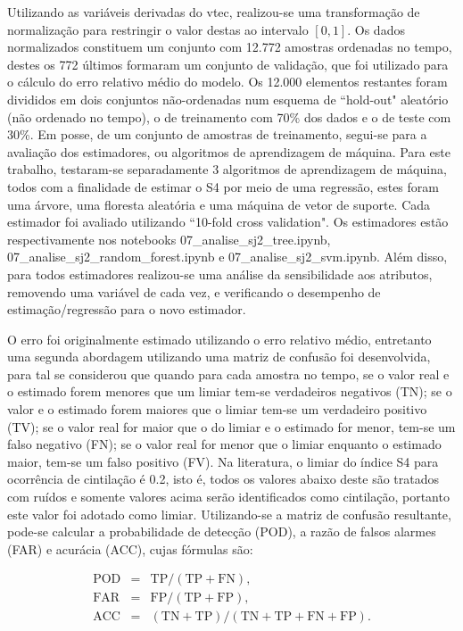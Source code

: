 Utilizando as variáveis derivadas do vtec, realizou-se uma transformação de normalização para restringir o valor destas ao intervalo $[0,1]$. Os dados normalizados constituem um conjunto com 12.772 amostras ordenadas no tempo, destes os 772 últimos formaram um conjunto de validação, que foi utilizado para o cálculo do erro relativo médio do modelo. Os 12.000 elementos restantes foram divididos em dois conjuntos não-ordenadas num esquema de ``hold-out" aleatório (não ordenado no tempo), o de treinamento com 70\% dos dados e o de teste com 30\%. Em posse, de um conjunto de amostras de treinamento, segui-se para a avaliação dos estimadores, ou algoritmos de aprendizagem de máquina. Para este trabalho, testaram-se separadamente 3 algoritmos de aprendizagem de máquina, todos com a finalidade de estimar o S4 por meio de uma regressão, estes foram uma árvore, uma floresta aleatória e uma máquina de vetor de suporte. Cada estimador  foi avaliado utilizando ``10-fold cross validation". Os estimadores estão respectivamente nos notebooks 07\_analise\_sj2\_tree.ipynb, 07\_analise\_sj2\_random\_forest.ipynb e 07\_analise\_sj2\_svm.ipynb. Além disso, para todos estimadores realizou-se uma análise da sensibilidade aos atributos, removendo uma variável de cada vez, e verificando o desempenho de estimação/regressão para o novo estimador. 

O erro foi originalmente estimado utilizando o erro relativo médio, entretanto uma segunda abordagem utilizando uma matriz de confusão foi desenvolvida, para tal se considerou que quando para cada amostra no tempo, se o valor real e o estimado forem menores que um limiar tem-se verdadeiros negativos (TN); se o valor e o estimado forem maiores que o limiar tem-se um verdadeiro positivo (TV); se o valor real for maior que o do limiar e o estimado for menor, tem-se um falso negativo (FN); se o valor real for menor que o limiar enquanto o estimado maior, tem-se um falso positivo (FV). Na literatura, o limiar do índice S4 para ocorrência de cintilação é 0.2, isto é, todos os valores abaixo deste são tratados com ruídos e somente valores acima serão identificados como cintilação, portanto este valor foi adotado como limiar. Utilizando-se a matriz de confusão resultante, pode-se calcular a probabilidade de detecção (POD), a razão de falsos alarmes (FAR) e acurácia (ACC), cujas fórmulas são:

\begin{eqnarray}
\mbox{POD}&=&\mbox{TP}/(\mbox{TP}+\mbox{FN})\mbox{,}\\
\mbox{FAR}&=&\mbox{FP}/(\mbox{TP}+\mbox{FP})\mbox{,}\\ 
\mbox{ACC}&=&(\mbox{TN}+\mbox{TP})/(\mbox{TN}+\mbox{TP}+\mbox{FN}+\mbox{FP})\mbox{.}
\end{eqnarray}

